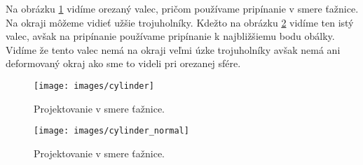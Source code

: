 Na obrázku \ref{obr:cylinder} vidíme orezaný valec, pričom používame
pripínanie v smere ťažnice. Na okraji môžeme vidieť užšie trojuholníky. 
Kdežto na obrázku \ref{obr:cylinder_normal} vidíme ten istý valec, 
avšak na pripínanie používame pripínanie k najbližšiemu bodu obálky.
Vidíme že tento valec nemá na okraji veľmi úzke trojuholníky avšak 
nemá ani deformovaný okraj ako sme to videli pri orezanej sfére.

\begin{figure}
    \centerline{\texttt{[image: images/cylinder]}}
    \caption[Projektovanie v smere ťažnice]{Projektovanie v smere ťažnice.}
    \label{obr:cylinder}
\end{figure}

\begin{figure}
    \centerline{\texttt{[image: images/cylinder\_normal]}}
    \caption[Projektovanie v smere ťažnice]{Projektovanie v smere ťažnice.}
    \label{obr:cylinder_normal}
\end{figure}


